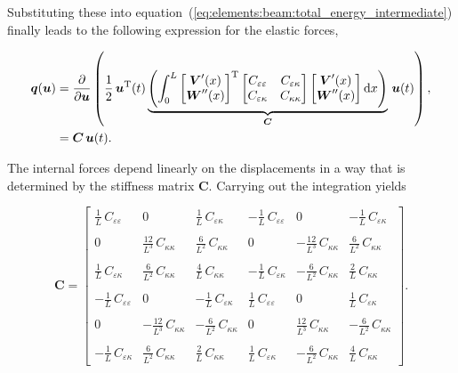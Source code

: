 Substituting these into equation~(\ref{eq:elements:beam:total_energy_intermediate}) finally leads to the following expression for the elastic forces,

\begin{align}
\boldsymbol{q}(\boldsymbol{u}) &= \frac{\partial}{\partial \boldsymbol{u}}\left(\frac{1}{2}\,\boldsymbol{u}^\mathrm{T}(t)
\underbrace{
\left(
\int_0^L
\begin{bmatrix}
\boldsymbol{V}'(x)\\
\boldsymbol{W}''(x)
\end{bmatrix}^\mathrm{T}
\begin{bmatrix}
C_{\varepsilon\varepsilon} & C_{\varepsilon\kappa}\\
C_{\varepsilon\kappa} & C_{\kappa\kappa}
\end{bmatrix}
\begin{bmatrix}
\boldsymbol{V}'(x)\\
\boldsymbol{W}''(x)
\end{bmatrix}
\mathrm{d}x
\right)
}_{\boldsymbol{C}}
\,\boldsymbol{u}(t)\right),\notag\\
&= \boldsymbol{C}\,\boldsymbol{u}(t).
\end{align}

The internal forces depend linearly on the displacements in a way that is determined by the stiffness matrix $\boldsymbol{C}$. Carrying out the integration yields

\begin{equation}
\boldsymbol{C} =
\begin{bmatrix}
\frac{1}{L}\,C_{\varepsilon\varepsilon} &
0 &
\frac{1}{L}\,C_{\varepsilon\kappa} &
-\frac{1}{L}\,C_{\varepsilon\varepsilon} &
0 &
-\frac{1}{L}\,C_{\varepsilon\kappa}\\ \\
0 &
\frac{12}{L^3}\,C_{\kappa\kappa} &
\frac{6}{L^2}\,C_{\kappa\kappa} &
0 &
-\frac{12}{L^3}\,C_{\kappa\kappa} &
\frac{6}{L^2}\,C_{\kappa\kappa}\\
\\
\frac{1}{L}\,C_{\varepsilon\kappa} &
\frac{6}{L^2}\,C_{\kappa\kappa} &
\frac{4}{L}\,C_{\kappa\kappa} &
-\frac{1}{L}\,C_{\varepsilon\kappa} &
-\frac{6}{L^2}\,C_{\kappa\kappa} &
\frac{2}{L}\,C_{\kappa\kappa}\\ \\
-\frac{1}{L}\,C_{\varepsilon\varepsilon} &
0 &
-\frac{1}{L}\,{C_{\varepsilon\kappa}} &
\frac{1}{L}\,C_{\varepsilon\varepsilon} &
0 &
\frac{1}{L}\,C_{\varepsilon\kappa}\\ \\
0 &
-\frac{12}{L^3}\,C_{\kappa\kappa} &
-\frac{6}{L^2}\,C_{\kappa\kappa} &
0 &
\frac{12}{L^3}\,C_{\kappa\kappa} &
-\frac{6}{L^2}\,C_{\kappa\kappa}\\ \\
-\frac{1}{L}\,C_{\varepsilon\kappa} &
\frac{6}{L^2}\,C_{\kappa\kappa} &
\frac{2}{L}\,C_{\kappa\kappa} &
\frac{1}{L}\,C_{\varepsilon\kappa} &
-\frac{6}{L^2}\,C_{\kappa\kappa} &
\frac{4}{L}\,C_{\kappa\kappa}
\end{bmatrix}.\label{eq:beam-linear-stiffness-matrix}
\end{equation}

